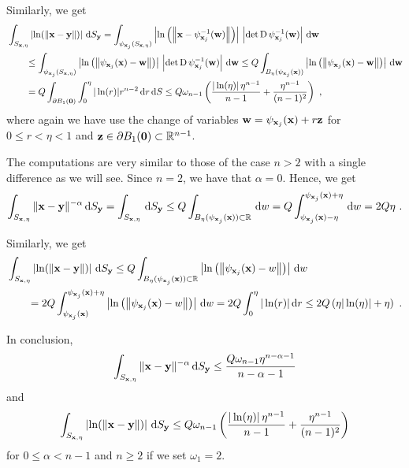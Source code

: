 Similarly, we get
\begin{align*}
&\int_{S_{\mathbf{x},\eta}} \left|\ln(\|\mathbf{x}-\mathbf{y}\|)\right| \,\mathrm{d}{S}_{\mathbf{y}}
= \int_{\psi_{\mathbf{x}_j}(S_{\mathbf{x},\eta})}
\left| \ln\left(\left\|\mathbf{x}
-\psi_{\mathbf{x}_j}^{-1}(\mathbf{w})\right\|\right)\right| \,
\left| \det \operatorname{D} \psi_{\mathbf{x}_j}^{-1}(\mathbf{w})\right| \,\mathrm{d}{\mathbf{w}} \\
& \qquad
\leq \int_{\psi_{\mathbf{x}_j}(S_{\mathbf{x},\eta})}
\left| \ln\left( \left\|\psi_{\mathbf{x}_j}(\mathbf{x})-\mathbf{w}\right\|\right)\right|
\, \left| \det \operatorname{D} \psi_{\mathbf{x}_j}^{-1}(\mathbf{w})\right| \,\mathrm{d}{\mathbf{w}}
\leq Q \int_{B_{\eta}(\psi_{\mathbf{x}_j}(\mathbf{x}))}
\left|\ln\left( \left\|\psi_{\mathbf{x}_j}(\mathbf{x})-\mathbf{w}\right\|\right)\right|
\,\mathrm{d}{\mathbf{w}} \\
&\qquad
= Q \int_{\partial B_1(\mathbf{0})} \int_0^\eta |\ln(r)|
  r^{n-2} \,\mathrm{d}{r} \,\mathrm{d}{S}
\leq Q \omega_{n-1} \left( \frac{|\ln(\eta)|\, \eta^{n-1}}{n-1}  +
  \frac{\eta^{n-1}}{(n-1)^2}  \right) \ ,
\end{align*}
where again we have use the change of variables 
$\mathbf{w} = \psi_{\mathbf{x}_j}(\mathbf{x}) + r \mathbf{z}$ for
$0 \leq r < \eta <1$ and
$\mathbf{z} \in \partial B_1(\mathbf{0}) \subset \mathbb{R}^{n-1}$.

The computations are very similar to those of the case $n>2$ with a
single difference as we will see.  Since $n = 2$, we have that
$\alpha = 0$.  Hence, we get
\[
\int_{S_{\mathbf{x},\eta}} \|\mathbf{x}-\mathbf{y}\|^{-\alpha} \,\mathrm{d}{S}_{\mathbf{y}}
= \int_{S_{\mathbf{x},\eta}} \,\mathrm{d}{S}_{\mathbf{y}}
\leq Q \int_{B_{\eta}(\psi_{\mathbf{x}_j}(\mathbf{x})) \subset \mathbb{R}} \,\mathrm{d}{w}
= Q \int_{\psi_{\mathbf{x}_j}(\mathbf{x})-\eta}^{\psi_{\mathbf{x}_j}(\mathbf{x})+\eta}
  \,\mathrm{d}{w} = 2 Q \eta  \ .
\]

Similarly, we get
\begin{align*}
&\int_{S_{\mathbf{x},\eta}} \left|\ln(\|\mathbf{x}-\mathbf{y}\|)\right| \,\mathrm{d}{S}_{\mathbf{y}}
\leq Q \int_{B_{\eta}(\psi_{\mathbf{x}_j}(\mathbf{x}))\subset \mathbb{R}}
\left|\ln\left( \left\|\psi_{\mathbf{x}_j}(\mathbf{x})-w\right\|\right)\right|
\,\mathrm{d}{w} \\
&\qquad = 2Q \int_{\psi_{\mathbf{x}_j}(\mathbf{x})}^{\psi_{\mathbf{x}_j}(\mathbf{x})+\eta}
\left| \ln\left( \left\|\psi_{\mathbf{x}_j}(\mathbf{x})-w\right\|\right) \right|
\,\mathrm{d}{w}
= 2Q \int_0^{\eta} |\ln(r)| \,\mathrm{d}{r}
\leq 2 Q \left( \eta |\ln(\eta)| + \eta \right) \ .
\end{align*}

In conclusion,
\begin{equation} \label{Sxepsint1}
\int_{S_{\mathbf{x},\eta}} \|\mathbf{x}-\mathbf{y}\|^{-\alpha} \,\mathrm{d}{S}_{\mathbf{y}}
\leq \frac{ Q \omega_{n-1} \eta^{n-\alpha-1}}{n-\alpha -1}
\end{equation}
and
\begin{equation} \label{Sxepsint2}
\int_{S_{\mathbf{x},\eta}} \left|\ln(\|\mathbf{x}-\mathbf{y}\|)\right| \,\mathrm{d}{S}_{\mathbf{y}}
\leq Q \omega_{n-1} \left( \frac{|\ln(\eta)|\, \eta^{n-1}}{n-1}  +
  \frac{\eta^{n-1}}{(n-1)^2} \right)
\end{equation}
for $0 \leq \alpha < n-1$ and $n\geq 2$ if we set
$\omega_1 = 2$.

